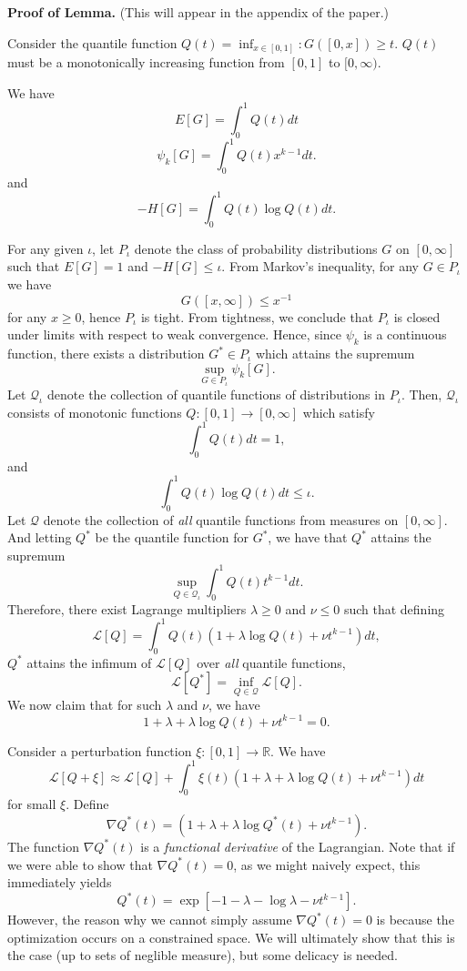 \documentclass[12pt]{article}
\begin{document}
\textbf{Proof of Lemma.} (This will appear in the appendix of the paper.)

Consider the quantile function $Q(t) = \inf_{x \in [0,1]}: G([0, x]) \geq t.$
$Q(t)$ must be a monotonically increasing function from $[0,1]$ to $[0,\infty).$

We have
\[
E[G] = \int_0^1 Q(t) dt
\]
\[
\psi_k[G] = \int_0^1 Q(t) x^{k-1} dt.
\]
and
\[
-H[G] = \int_0^1 Q(t) \log Q(t) dt.
\]

For any given $\iota$, let $P_\iota$ denote the class of probability
distributions $G$ on $[0, \infty]$ such that $E[G]=1$ and
$-H[G] \leq \iota.$  From Markov's inequality, for any $G \in P_\iota$
we have
\[
G([x, \infty]) \leq x^{-1}
\]
for any $x \geq 0$, hence $P_\iota$ is tight.  From tightness, we
conclude that $P_\iota$ is closed under limits with respect to weak
convergence.  Hence, since $\psi_k$ is a continuous function, there
exists a distribution $G^* \in P_\iota$ which attains the supremum
\[\sup_{G \in P_\iota} \psi_k[G].\]
Let $\mathcal{Q}_\iota$ denote the collection of quantile functions of
distributions in $P_\iota.$ Then, $\mathcal{Q}_\iota$ consists of monotonic functions
$Q: [0,1] \to [0, \infty]$ which
satisfy
\[
\int_0^1 Q(t) dt = 1,
\]
and
\[
\int_0^1 Q(t) \log Q(t) dt \leq \iota.
\]
Let $\mathcal{Q}$ denote the collection of \emph{all} quantile functions from measures on $[0,\infty]$.
And letting $Q^*$ be the quantile function for $G^*$, we have that
$Q^*$ attains the supremum
\[
\sup_{Q \in \mathcal{Q}_\iota} \int_0^1 Q(t) t^{k-1} dt.
\]
Therefore, there exist Lagrange multipliers
$\lambda \geq 0$ and $\nu \leq 0$ such that defining
\[
\mathcal{L}[Q] = \int_0^1 Q(t) (1 + \lambda \log Q(t) + \nu t^{k-1}) dt,
\]
$Q^*$ attains the infimum of $\mathcal{L}[Q]$ over \emph{all} quantile functions,
\[
\mathcal{L}[Q^*] = \inf_{Q \in \mathcal{Q}}\mathcal{L}[Q].
\]
We now claim that for such $\lambda$ and $\nu$, we have
\[
1 + \lambda + \lambda \log Q(t) + \nu t^{k-1} = 0.
\]

Consider a perturbation function $\xi: [0,1] \to \mathbb{R}$.
We have
\[
\mathcal{L}[Q + \xi] \approx \mathcal{L}[Q] + \int_0^1 \xi(t) (1 + \lambda + \lambda \log Q(t) + \nu t^{k-1}) dt
\]
for small $\xi$.
Define
\[
\nabla Q^*(t) = (1 + \lambda + \lambda \log Q^*(t) + \nu t^{k-1}).
\]
The function $\nabla Q^*(t)$ is a \emph{functional derivative} of the Lagrangian.
Note that if we were able to show that $\nabla Q^*(t) = 0$, as we might naively expect,
this immediately yields
\begin{equation}\label{eq:Qstareq}
Q^*(t) = \exp[-1 - \lambda -\log \lambda - \nu t^{k-1}].
\end{equation}
However, the reason why we cannot simply assume $\nabla Q^*(t) = 0$ is
because the optimization occurs on a constrained space.  We will
ultimately show that this is the case (up to sets of neglible
measure), but some delicacy is needed.
\end{document}
